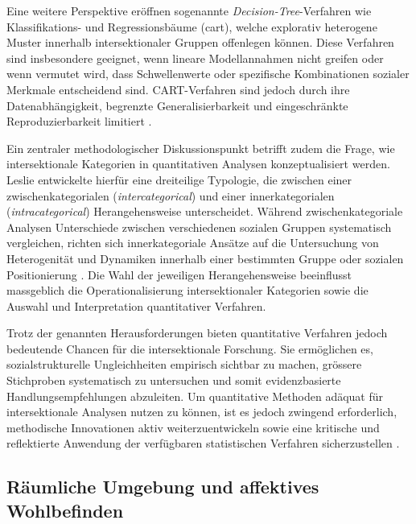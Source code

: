 Eine weitere Perspektive eröffnen sogenannte \emph{Decision-Tree}-Verfahren wie Klassifikations- und Regressionsbäume (\acrshort{cart}), welche explorativ heterogene Muster innerhalb intersektionaler Gruppen offenlegen können. Diese Verfahren sind insbesondere geeignet, wenn lineare Modellannahmen nicht greifen oder wenn vermutet wird, dass Schwellenwerte oder spezifische Kombinationen sozialer Merkmale entscheidend sind. CART-Verfahren sind jedoch durch ihre Datenabhängigkeit, begrenzte Generalisierbarkeit und eingeschränkte Reproduzierbarkeit limitiert \parencite{bauerIntersectionalityQuantitativeResearch2021}.

Ein zentraler methodologischer Diskussionspunkt betrifft zudem die Frage, wie intersektionale Kategorien in quantitativen Analysen konzeptualisiert werden. Leslie \textcite{mccallComplexityIntersectionality2005} entwickelte hierfür eine dreiteilige Typologie, die zwischen einer zwischenkategorialen (\textit{intercategorical}) und einer innerkategorialen (\textit{intracategorical}) Herangehensweise unterscheidet. Während zwischenkategoriale Analysen Unterschiede zwischen verschiedenen sozialen Gruppen systematisch vergleichen, richten sich innerkategoriale Ansätze auf die Untersuchung von Heterogenität und Dynamiken innerhalb einer bestimmten Gruppe oder sozialen Positionierung \parencite{bauerAdvancingQuantitativeIntersectionality2019}. Die Wahl der jeweiligen Herangehensweise beeinflusst massgeblich die Operationalisierung intersektionaler Kategorien sowie die Auswahl und Interpretation quantitativer Verfahren.

Trotz der genannten Herausforderungen bieten quantitative Verfahren jedoch bedeutende Chancen für die intersektionale Forschung. Sie ermöglichen es, sozialstrukturelle Ungleichheiten empirisch sichtbar zu machen, grössere Stichproben systematisch zu untersuchen und somit evidenzbasierte Handlungsempfehlungen abzuleiten. Um quantitative Methoden adäquat für intersektionale Analysen nutzen zu können, ist es jedoch zwingend erforderlich, methodische Innovationen aktiv weiterzuentwickeln sowie eine kritische und reflektierte Anwendung der verfügbaren statistischen Verfahren sicherzustellen \parencite{bauerIntersectionalityQuantitativeResearch2021, bauerAdvancingQuantitativeIntersectionality2019, scottIntersectionalityQuantitativeMethods2017}.


\subsection{Räumliche Umgebung und affektives Wohlbefinden}

